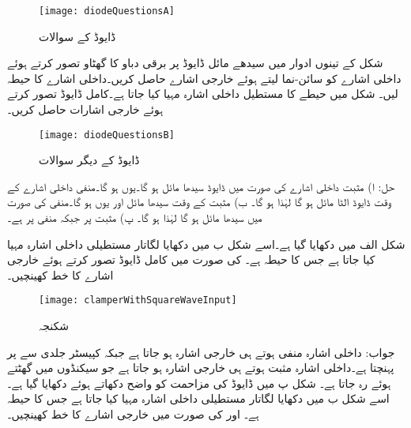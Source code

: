 \begin{figure}
\centering
\texttt{[image: diodeQuestionsA]}
\caption{ڈایوڈ کے سوالات}
\label{شکل_ڈایوڈ_کے_سوالات_الف}
\end{figure}
شکل  کے تینوں ادوار میں  سیدھے مائل ڈایوڈ پر  برقی دباو کا گھٹاو تصور کرتے ہوئے  داخلی اشارے  کو سائن-نما لیتے ہوئے خارجی اشارے  حاصل کریں۔داخلی اشارے کا حیطہ  لیں۔ 
شکل  میں  حیطے کا مستطیل داخلی اشارہ مہیا کیا جاتا ہے۔کامل ڈایوڈ تصور کرتے ہوئے خارجی اشارات حاصل  کریں۔ 
\begin{figure}
\centering
\texttt{[image: diodeQuestionsB]}
\caption{ڈایوڈ کے دیگر سوالات}
\label{شکل_ڈایوڈ_کے_دیگر_سوالات}
\end{figure}

حل:
ا) مثبت داخلی اشارے کی صورت میں ڈایوڈ سیدھا مائل ہو گا۔یوں  ہو گا۔منفی داخلی اشارے کے وقت ڈایوڈ الٹا مائل ہو گا لہٰذا  ہو گا۔ ب) مثبت  کے وقت  سیدھا مائل اور یوں  ہو گا۔منفی  کی صورت میں  سیدھا مائل ہو گا لہٰذا  ہو گا۔ پ) مثبت  پر   جبکہ منفی  پر  ہے۔

شکل  الف میں  دکھایا گیا ہے۔اسے شکل  ب میں دکھایا لگاتار مستطیلی داخلی اشارہ مہیا کیا جاتا ہے جس کا حیطہ  ہے۔ کی صورت میں  کامل ڈایوڈ تصور کرتے ہوئے خارجی اشارے کا خط کھینچیں۔
\begin{figure}
\centering
\texttt{[image: clamperWithSquareWaveInput]}
\caption{شکنجہ}
\label{شکل_سوالات_شکنجہ}
\end{figure}

جواب: داخلی اشارہ منفی ہوتے ہی خارجی اشارہ  ہو جاتا ہے جبکہ کپیسٹر جلدی سے  پر پہنچتا ہے۔داخلی اشارہ مثبت ہوتے ہی خارجی اشارہ  ہو جاتا ہے جو  سیکنڈوں میں گھٹتے ہوئے  رہ جاتا ہے۔
شکل  پ میں ڈایوڈ کی مزاحمت  کو واضح دکھاتے ہوئے  دکھایا گیا ہے۔اسے شکل  ب میں دکھایا لگاتار مستطیلی داخلی اشارہ مہیا کیا جاتا ہے  جس کا حیطہ  ہے۔ اور  کی صورت میں خارجی اشارے کا خط کھینچیں۔

